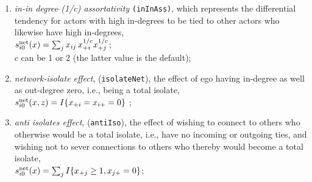 \documentclass[a4paper,fleqn,11pt]{article}
\newcommand{\+}{\, + \,}
\newcommand{\vit}{\theenumi}
\newcommand{\rs}{{\sf RSiena}}
\newcommand{\RS}{{\sf RSiena }}
\newcounter{savenumi}
\begin{document}
\begin{enumerate}
 \item {\em in-in degree$\,\hat{\ }$(1/c) assortativity}
 \texttt{(inInAss)},
 which represents the differential tendency for actors with high in-degrees
 to be tied to other actors who likewise have high in-degrees,\\
 $s^{\rm net}_{i\vit}(x) = \sum_j x_{ij}\, {x_{+i}^{1/c}} {x_{+j}^{1/c}} $;\\
 $c$ can be 1 or 2 (the latter value is the default);

\item \emph{network-isolate effect}, (\texttt{isolateNet}), the effect of ego having
      in-degree as well as out-degree zero, i.e., being a total isolate,\\
 $s^{\rm net}_{i\vit}(x, z) =   I\{x_{+i} = x_{i+} = 0 \}  $ ;

\item \emph{anti isolates effect}, (\texttt{antiIso}), the effect of
      wishing to connect to others who otherwise would
      be a total isolate, i.e., have no incoming or outgoing
      ties, and wishing not to sever connections to
      others who thereby would become a total isolate,\\
$s^{\rm net}_{i\vit}(x) = \sum_j I\{x_{+j} \geq 1, x_{j+} = 0\} $;\\


\end{enumerate}
\end{document}
